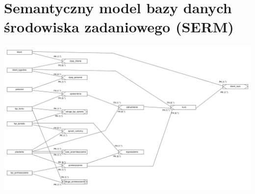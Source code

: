 \section{Semantyczny model bazy danych środowiska zadaniowego (SERM)}

\includegraphics[angle=90,origin=c,scale=0.5]{SERM_rev_2.png}
